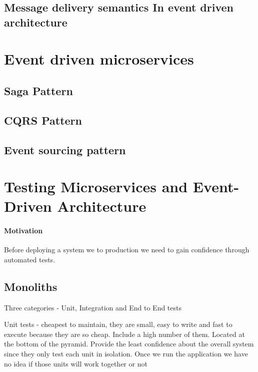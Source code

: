 \documentclass[a4paper, 11pt]{book}
\begin{document}
    \subsection{Message delivery semantics In event driven architecture}

    \section{Event driven microservices}

    \subsection{Saga Pattern}

    \subsection{CQRS Pattern}

    \subsection{Event sourcing pattern}

    \section{Testing Microservices and Event-Driven Architecture}

    \paragraph{Motivation} Before deploying a system we to production we need to gain confidence through automated tests.

    \subsection{Monoliths}
    Three categories - Unit, Integration and End to End tests

    Unit tests - cheapest to maintain, they are small, easy to write and fast to execute because they are so cheap.
    Include a high number of them.
    Located at the bottom of the pyramid.
    Provide the least confidence about the overall system since they only test each unit in isolation.
    Once we run the application we have no idea if those units will work together or not
\end{document}
